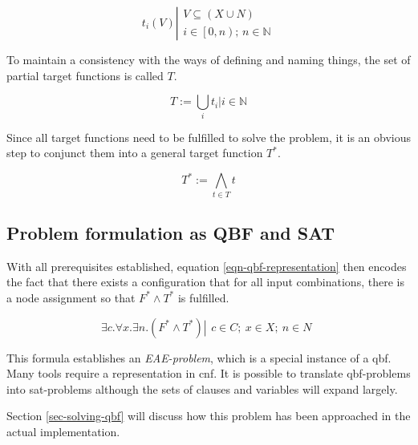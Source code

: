 	\begin{equation}
	t_ i\left( V \right)
	\left|
	\begin{array}{l}
		V \subseteq \left( X \cup N \right) \\
		i \in \left[0,n\right); \, n \in \mathbb{N}
	\end{array}
	\right.
	\end{equation}

	To maintain a consistency with the ways of defining and naming things, the set of partial target functions is called $T$.

	\begin{equation}
		T := \bigcup_i t_i
	\left|
		i \in \mathbb{N}
	\right.
	\end{equation}		
	
	Since all target functions need to be fulfilled to solve the problem, it is an obvious step to conjunct them into a general target function $T^*$.
	
	\begin{equation}
		T^* := \bigwedge_{t \in T} t
	\end{equation}	 
	
\subsection{Problem formulation as QBF and SAT}
	\label{sec-qbf-to-sat}
	With all prerequisites established, equation \ref{eqn-qbf-representation} then encodes the fact that there exists a configuration that for all input combinations, there is a node assignment so that $F^* \wedge T^*$ is fulfilled.

	\begin{equation}
		\label{eqn-qbf-representation}
			\exists c.\forall x. \exists n. \left( F^* \wedge T^* \right)
		\left|
		\begin{array}{l}		 
			c \in C;\ x \in X;\  n \in N
		\end{array}	
		\right.
	\end{equation}
	
	This formula establishes an \emph{EAE-problem}, which is a special instance of a \gls{qbf}.
	Many tools require a representation in \gls{cnf}.
	It is possible to translate \gls{qbf}-problems into \gls{sat}-problems although the sets of clauses and variables will expand largely. \cite{SATinQBF}
	
	Section \ref{sec-solving-qbf} will discuss how this problem has been approached in the actual implementation.
	
